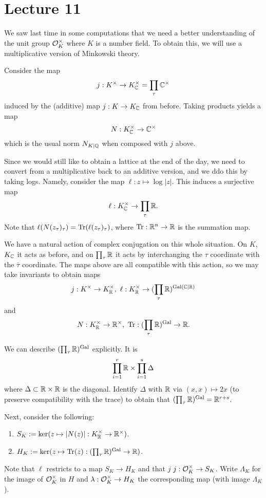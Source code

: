 \section{Lecture 11}

We saw last time in some computations that we need a better understanding of the unit group $\mathcal{O}_{K}^{\times}$ where $K$ is a number field.
To obtain this, we will use a multiplicative version of Minkowski theory.

Consider the map
\[ j : K^{\times} \to K_{\mathbb{C}}^{\times} = \prod_{\tau} \mathbb{C}^{\times} \]
induced by the (additive) map $j : K \to K_{\mathbb{C}}$ from before.
Taking products yields a map
\[ N : K_{\mathbb{C}}^{\times} \to \mathbb{C}^{\times} \]
which is the usual norm $N_{K|\mathbb{Q}}$ when composed with $j$ above.

Since we would still like to obtain a lattice at the end of the day, we need to convert from a multiplicative back to an additive version, and we ddo this by taking logs.
Namely, consider the map $\ell : z \mapsto \log|z|$.
This induces a surjective map
\[ \ell : K_{\mathbb{C}}^{\times} \to \prod_{\tau} \mathbb{R}. \]
Note that $\ell(N(z_{\tau})_{\tau}) = \operatorname{Tr}(\ell(z_{\tau})_{\tau})$, where $\operatorname{Tr} : \mathbb{R}^{n} \to \mathbb{R}$ is the summation map.

We have a natural action of complex conjugation on this whole situation.
On $K$, $K_{\mathbb{C}}$ it acts as before, and on $\prod_{\tau} \mathbb{R}$ it acts by interchanging the $\tau$ coordinate with the $\bar\tau$ coordinate.
The maps above are all compatible with this action, so we may take invariants to obtain maps
\[ j : K^{\times} \to K_{\mathbb{R}}^{\times}, \ \ell : K_{\mathbb{R}}^{\times} \to (\prod_{\tau} \mathbb{R})^{\operatorname{Gal}(\mathbb{C}|\mathbb{R})} \]
and
\[ N : K_{\mathbb{R}}^{\times} \to \mathbb{R}^{\times}, \ \operatorname{Tr} : (\prod_{\tau} \mathbb{R})^{\operatorname{Gal}} \to \mathbb{R}. \]

We can describe $(\prod_{\tau} \mathbb{R})^{\operatorname{Gal}}$ explicitly.
It is
\[ \prod_{i = 1}^{r} \mathbb{R} \times \prod_{i = 1}^{s} \Delta \]
where $\Delta \subset \mathbb{R} \times \mathbb{R}$ is the diagonal.
Identify $\Delta$ with $\mathbb{R}$ via $(x,x) \mapsto 2x$ (to preserve compatibility with the trace) to obtain that $(\prod_{\tau} \mathbb{R})^{\operatorname{Gal}} = \mathbb{R}^{r + s}$.

Next, consider the following:
\begin{enumerate}
  \item $S_{K} := \ker(z \mapsto |N(z)| : K_{\mathbb{R}}^{\times} \to \mathbb{R}^{\times})$.
  \item $H_{K} := \ker(z \mapsto \operatorname{Tr}(z) : (\prod_{\tau} \mathbb{R})^{\operatorname{Gal}} \to \mathbb{R})$.
\end{enumerate}
Note that $\ell$ restricts to a map $S_{K} \to H_{K}$ and that $j$  $j : \mathcal{O}_{K}^{\times} \to S_{K}$.
Write $\Lambda_{K}$ for the image of $\mathcal{O}_{K}^{\times}$ in $H$ and $\lambda : \mathcal{O}_{K}^{\times} \to H_{K}$ the corresponding map (with image $\Lambda_{K}$).

